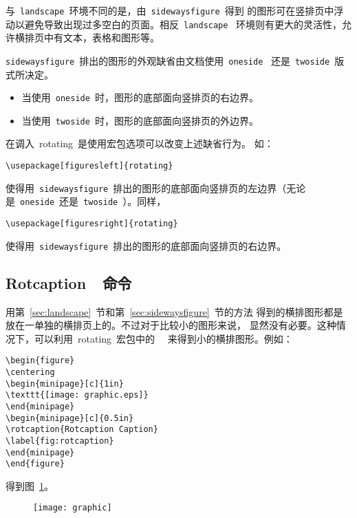 与~\texttt{landscape}~环境不同的是，由~\texttt{sidewaysfigure}~得到
的图形可在竖排页中浮动以避免导致出现过多空白的页面。相反~\texttt{landscape}~
环境则有更大的灵活性，允许横排页中有文本，表格和图形等。

\texttt{sidewaysfigure}~排出的图形的外观缺省由文档使用~\texttt{oneside}~
还是~\texttt{twoside}~版式所决定。
\begin{itemize}
	\item 当使用~\texttt{oneside}~时，图形的底部面向竖排页的右边界。
	\item 当使用~\texttt{twoside}~时，图形的底部面向竖排页的外边界。
\end{itemize}
在调入~\textsf{rotating}~是使用宏包选项可以改变上述缺省行为。
如：
\begin{Verbatim}[xleftmargin=1cm]
\usepackage[figuresleft]{rotating}
\end{Verbatim}
使得用~\texttt{sidewaysfigure}~排出的图形的底部面向竖排页的左边界（无论
是~\texttt{oneside}~还是~\texttt{twoside}~）。同样，
\begin{Verbatim}[xleftmargin=1cm]
\usepackage[figuresright]{rotating}
\end{Verbatim}
使得用~\texttt{sidewaysfigure}~排出的图形的底部面向竖排页的右边界。

\subsection{Rotcaption~~命令}

用第~\ref{sec:landscape}~节和第~\ref{sec:sidewaysfigure}~节的方法
得到的横排图形都是放在一单独的横排页上的。不过对于比较小的图形来说，
显然没有必要。这种情况下，可以利用~\textsf{rotating}~宏包中的
~~来得到小的横排图形。例如：
\begin{Verbatim}[xleftmargin=1cm]
\begin{figure} 
\centering 
\begin{minipage}[c]{1in} 
\texttt{[image: graphic.eps]}
\end{minipage} 
\begin{minipage}[c]{0.5in} 
\rotcaption{Rotcaption Caption} 
\label{fig:rotcaption} 
\end{minipage} 
\end{figure}
\end{Verbatim}
得到图~\ref{fig:rotcaption}。

\begin{figure} 
	\centering 
	\begin{minipage}[c]{1in}
		\texttt{[image: graphic]}  
	\end{minipage}
	\begin{minipage}[c]{0.5in} 
		\label{fig:rotcaption} 
	\end{minipage}
\end{figure}

